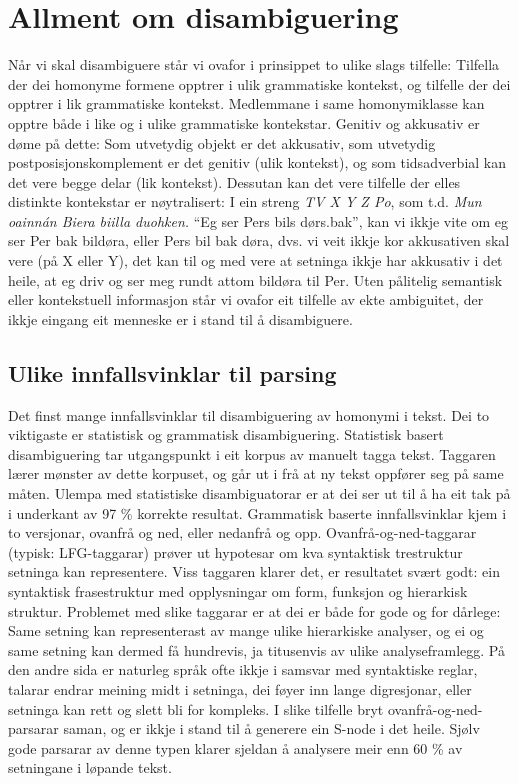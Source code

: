 \documentclass[a4paper,norsk]{article}
\begin{document}
\section{Allment om disambiguering}

Når vi skal disambiguere står vi ovafor i prinsippet to ulike slags tilfelle: Tilfella der dei homonyme formene opptrer i ulik grammatiske kontekst, og tilfelle der dei opptrer i lik grammatiske kontekst. Medlemmane i same homonymiklasse kan opptre både i like og i ulike grammatiske kontekstar. Genitiv og akkusativ er døme på dette: Som utvetydig objekt er det akkusativ, som utvetydig postposisjonskomplement er det genitiv (ulik kontekst), og som tidsadverbial kan det vere begge delar (lik kontekst). Dessutan kan det vere tilfelle der elles distinkte kontekstar er nøytralisert: I ein streng \textit{TV X Y Z Po}, som t.d. \textit{Mun oainnán Biera biilla duohken.} ``Eg ser Pers bils dørs.bak'', kan vi ikkje vite om eg ser Per bak bildøra, eller Pers bil bak døra, dvs. vi veit ikkje kor akkusativen skal vere (på X eller Y), det kan til og med vere at setninga ikkje har akkusativ i det heile, at eg driv og ser meg rundt attom bildøra til Per. Uten pålitelig semantisk eller kontekstuell informasjon står vi ovafor eit tilfelle av ekte ambiguitet, der ikkje eingang eit menneske er i stand til å disambiguere.%


\subsection{Ulike innfallsvinklar til parsing}

Det finst mange innfallsvinklar til disambiguering av homonymi i tekst. Dei to viktigaste er statistisk og grammatisk disambiguering. Statistisk basert disambiguering tar utgangspunkt i eit korpus av manuelt tagga tekst. Taggaren lærer mønster av dette korpuset, og går ut i frå at ny tekst oppfører seg på same måten. Ulempa med statistiske disambiguatorar er at dei ser ut til å ha eit tak på i underkant av 97 \% korrekte resultat.  Grammatisk baserte innfallsvinklar kjem i to versjonar, ovanfrå og ned, eller nedanfrå og opp. Ovanfrå-og-ned-taggarar (typisk: LFG-taggarar) prøver ut hypotesar om kva syntaktisk trestruktur setninga kan representere. Viss taggaren klarer det, er resultatet svært godt: ein syntaktisk frasestruktur med opplysningar om form, funksjon og hierarkisk struktur. Problemet med slike taggarar er at dei er både for gode og for dårlege: Same setning kan representerast av mange ulike hierarkiske analyser, og ei og same setning kan dermed få hundrevis, ja titusenvis av ulike analyseframlegg. På den andre sida er naturleg språk ofte ikkje i samsvar med syntaktiske reglar, talarar endrar meining midt i setninga, dei føyer inn lange digresjonar, eller setninga kan rett og slett bli for kompleks. I slike tilfelle bryt ovanfrå-og-ned-parsarar saman, og er ikkje i stand til å generere ein S-node i det heile. Sjølv gode parsarar av denne typen klarer sjeldan å analysere meir enn 60 \% av setningane i løpande tekst.%
\end{document}
